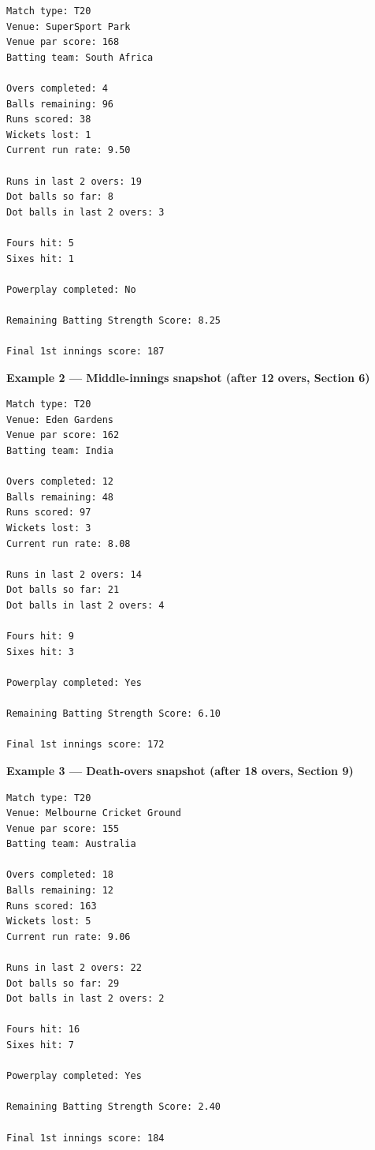 \begin{verbatim}
Match type: T20
Venue: SuperSport Park
Venue par score: 168
Batting team: South Africa

Overs completed: 4
Balls remaining: 96
Runs scored: 38
Wickets lost: 1
Current run rate: 9.50

Runs in last 2 overs: 19
Dot balls so far: 8
Dot balls in last 2 overs: 3

Fours hit: 5
Sixes hit: 1

Powerplay completed: No

Remaining Batting Strength Score: 8.25

Final 1st innings score: 187
\end{verbatim}

\bigskip
\noindent\textbf{Example 2 — Middle-innings snapshot (after 12 overs, Section 6)}

\begin{verbatim}
Match type: T20
Venue: Eden Gardens
Venue par score: 162
Batting team: India

Overs completed: 12
Balls remaining: 48
Runs scored: 97
Wickets lost: 3
Current run rate: 8.08

Runs in last 2 overs: 14
Dot balls so far: 21
Dot balls in last 2 overs: 4

Fours hit: 9
Sixes hit: 3

Powerplay completed: Yes

Remaining Batting Strength Score: 6.10

Final 1st innings score: 172
\end{verbatim}

\bigskip
\noindent\textbf{Example 3 — Death-overs snapshot (after 18 overs, Section 9)}

\begin{verbatim}
Match type: T20
Venue: Melbourne Cricket Ground
Venue par score: 155
Batting team: Australia

Overs completed: 18
Balls remaining: 12
Runs scored: 163
Wickets lost: 5
Current run rate: 9.06

Runs in last 2 overs: 22
Dot balls so far: 29
Dot balls in last 2 overs: 2

Fours hit: 16
Sixes hit: 7

Powerplay completed: Yes

Remaining Batting Strength Score: 2.40

Final 1st innings score: 184
\end{verbatim}

